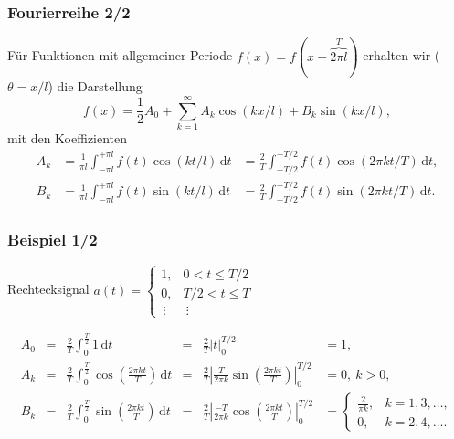 \documentclass[hyperref={pdfpagemode=FullScreen, colorlinks=false}]{beamer}
\begin{document}
\begin{frame}
\frametitle{Fourierreihe 2/2}
Für Funktionen mit allgemeiner Periode $f(x)=f(x+\overbrace{2\pi l}^{T})$ erhalten wir ($\theta=x/l$) die Darstellung
\begin{equation*}
 f(x)=\frac{1}{2}A_0 + \sum_{k=1}^{\infty} A_k \cos(kx/l) + B_k \sin(kx/l),
\end{equation*}
mit den Koeffizienten
\begin{align*}
 A_k &=\frac{1}{\pi l}\int_{-\pi l}^{+\pi l} f(t)\cos(kt/l)\,\mathrm{d}t
     &=\frac{2}{T}\int_{-T/2}^{+T/2} f(t)\cos(2\pi kt/T)\,\mathrm{d}t
 ,\\
 B_k &=\frac{1}{\pi l}\int_{-\pi l}^{+\pi l} f(t)\sin(kt/l)\,\mathrm{d}t
     &=\frac{2}{T}\int_{-T/2}^{+T/2} f(t)\sin(2\pi kt/T)\,\mathrm{d}t.
\end{align*}


\end{frame}


\begin{frame}
\frametitle{Beispiel 1/2}

Rechtecksignal $a(t)=\left\{\begin{array}{ll}
                             1, & 0 < t \le T/2\\
                             0, & T/2 < t \le T\\
                             \,\vdots & \ \vdots 
                            \end{array}
  \right.$ 
  \hfill

 \begin{align*}
 A_0&=&\frac{2}{T} \int_{0}^\frac{T}{2} 1\,\mathrm{d}t&=&\frac{2}{T}\bigl|t\bigr|_{0}^{T/2}&=1, \\[1mm]
 A_k&=& \frac{2}{T} \int_{0}^\frac{T}{2} \cos\left(\frac{2\pi kt}{T}\right) \,\mathrm{d}t  
 &=&\frac{2}{T} \left|\frac{T}{2\pi k} \sin\left(\frac{2\pi kt}{T}\right) \right|_0^{T/2} &=0, \ k>0,
 \\[1mm]
 B_k&=& \frac{2}{T} \int_{0}^\frac{T}{2} \sin\left(\frac{2\pi kt}{T}\right) \,\mathrm{d}t  
 &=&\frac{2}{T} \left|\frac{-T}{2\pi k} \cos\left(\frac{2\pi kt}{T}\right) \right|_0^{T/2} &=
 \left\{\begin{array}{ll}
    \frac{2}{\pi k},& k=1,3, \dots ,\\
    0, & k=2,4, \dots .
        \end{array} \right.
 \end{align*}
 
\end{frame}
\end{document}
